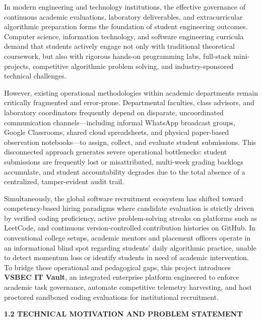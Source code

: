 {\fontsize{12pt}{17.8pt}\selectfont
In modern engineering and technology institutions, the effective governance of continuous academic evaluations, laboratory deliverables, and extracurricular algorithmic preparation forms the foundation of student engineering outcomes. Computer science, information technology, and software engineering curricula demand that students actively engage not only with traditional theoretical coursework, but also with rigorous hands-on programming labs, full-stack mini-projects, competitive algorithmic problem solving, and industry-sponsored technical challenges.

However, existing operational methodologies within academic departments remain critically fragmented and error-prone. Departmental faculties, class advisors, and laboratory coordinators frequently depend on disparate, uncoordinated communication channels---including informal WhatsApp broadcast groups, Google Classrooms, shared cloud spreadsheets, and physical paper-based observation notebooks---to assign, collect, and evaluate student submissions. This disconnected approach generates severe operational bottlenecks: student submissions are frequently lost or misattributed, multi-week grading backlogs accumulate, and student accountability degrades due to the total absence of a centralized, tamper-evident audit trail.

Simultaneously, the global software recruitment ecosystem has shifted toward competency-based hiring paradigms where candidate evaluation is strictly driven by verified coding proficiency, active problem-solving streaks on platforms such as LeetCode, and continuous version-controlled contribution histories on GitHub. In conventional college setups, academic mentors and placement officers operate in an informational blind spot regarding students' daily algorithmic practice, unable to detect momentum loss or identify students in need of academic intervention. To bridge these operational and pedagogical gaps, this project introduces \textbf{VSBEC IT Vault}, an integrated enterprise platform engineered to enforce academic task governance, automate competitive telemetry harvesting, and host proctored sandboxed coding evaluations for institutional recruitment.

\vspace{0.4cm}
{\fontsize{14pt}{18pt}\selectfont\bfseries 1.2 TECHNICAL MOTIVATION AND PROBLEM STATEMENT\par}
\vspace{0.3cm}

}
